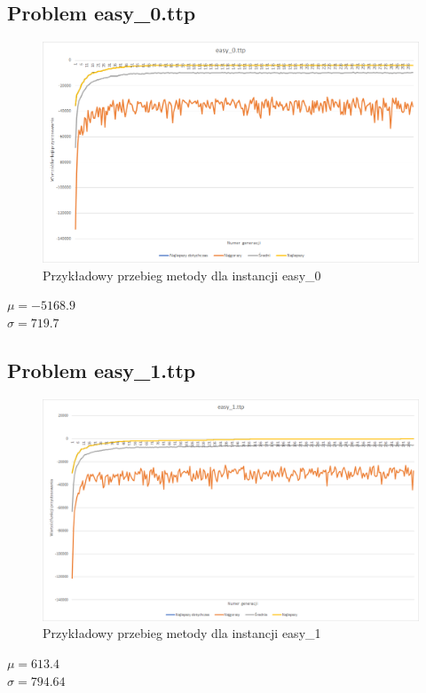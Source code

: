 \documentclass{article}
\begin{document}
	\subsection{Problem easy\_0.ttp}
	\begin{figure}[H]
		\centering
		\includegraphics[width=1\linewidth]{easy0.png}
		\caption{Przykładowy przebieg metody dla instancji easy\_0}
		\label{fig:easy0}
	\end{figure}
	\begin{center}
		$\mu = -5168.9$
		\\$\sigma =719.7$
	\end{center}


	\subsection{Problem easy\_1.ttp}
	\begin{figure}[H]
		\centering
		\includegraphics[width=1\linewidth]{easy1.png}
		\caption{Przykładowy przebieg metody dla instancji easy\_1}
		\label{fig:easy1}
	\end{figure}
	\begin{center}
		$\mu = 613.4$
		\\$\sigma =794.64$
	\end{center}
\end{document}
